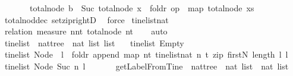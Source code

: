 \begin{isabellebody}
\ \ \ \ \ \ \ total{\isacharunderscore}node\ b\ {\isacharless}\ Suc\ {\isacharparenleft}total{\isacharunderscore}node\ x\ {\isacharplus}\ foldr\ op\ {\isacharplus}\ {\isacharparenleft}map\ total{\isacharunderscore}node\ xs{\isacharparenright}\ {}{\isacharparenright}{\isachardoublequoteclose}\isanewline
%
\isadelimproof
%
\endisadelimproof
%
\isatagproof
{}\isamarkupfalse%
\ total{\isacharunderscore}nod{\isacharunderscore}dec\ set{\isacharunderscore}zip{\isacharunderscore}rightD\ \isamarkupfalse%
\ force%
\endisatagproof
{\isafoldproof}%
%
\isadelimproof
\isanewline
%
\endisadelimproof
\isanewline
{}\isamarkupfalse%
\ tinelist{\isacharunderscore}nat\isanewline
%
\isadelimproof
\ \ %
\endisadelimproof
%
\isatagproof
{}\isamarkupfalse%
\ {\isacharparenleft}relation\ {\isachardoublequoteopen}measure\ {\isacharparenleft}{\isasymlambda}{\isacharparenleft}n{\isacharcomma}nt{\isacharparenright}{\isachardot}\ total{\isacharunderscore}node\ nt{\isacharparenright}{\isachardoublequoteclose}{\isacharparenright}\isanewline
\ \ \isamarkupfalse%
\ auto\isanewline
\ \ \isamarkupfalse%
%
\endisatagproof
{\isafoldproof}%
%
\isadelimproof
\isanewline
%
\endisadelimproof
\ \ \ \isanewline
{}\isamarkupfalse%
\ tinelist\ {\isacharcolon}{\isacharcolon}\ {\isachardoublequoteopen}nattree\ {\isasymRightarrow}\ {\isacharparenleft}nat\ list{\isacharparenright}\ list{\isachardoublequoteclose}\ \isanewline
\ \ {\isachardoublequoteopen}tinelist\ Empty\ {\isacharequal}\ {\isacharbrackleft}{\isacharbrackright}{\isachardoublequoteclose}\ \isanewline
{\isacharbar}\ {\isachardoublequoteopen}tinelist\ {\isacharparenleft}Node\ {}\ l{\isacharparenright}\ {\isacharequal}\ {\isacharparenleft}foldr\ append\ {\isacharparenleft}map\ {\isacharparenleft}{\isasymlambda}{\isacharparenleft}n{\isacharcomma}t{\isacharparenright}{\isachardot}\ tinelist{\isacharunderscore}nat\ n\ t{\isacharparenright}\ {\isacharparenleft}zip\ {\isacharparenleft}firstN\ {\isacharparenleft}length\ l{\isacharparenright}{\isacharparenright}\ l{\isacharparenright}{\isacharparenright}\ {\isacharbrackleft}{\isacharbrackright}{\isacharparenright}{\isachardoublequoteclose}\isanewline
{\isacharbar}\ {\isachardoublequoteopen}tinelist\ {\isacharparenleft}Node\ {\isacharparenleft}Suc\ n{\isacharparenright}\ l{\isacharparenright}\ {\isacharequal}\ {\isacharbrackleft}{\isacharbrackright}{\isachardoublequoteclose}\ \isanewline
\ \ \isanewline
{}\isamarkupfalse%
\ getLabelFromTine\ {\isacharcolon}{\isacharcolon}\ {\isachardoublequoteopen}nattree\ {\isasymRightarrow}\ nat\ list\ {\isasymRightarrow}\ nat\ list{\isachardoublequoteclose}\ \ \isanewline

\end{isabellebody}
